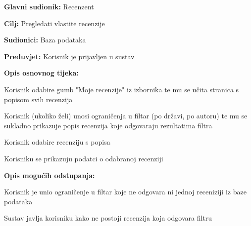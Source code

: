 					\noindent {}
					\begin{packed_item}
						
						\item \textbf{Glavni sudionik: } Recenzent
						\item  \textbf{Cilj:} Pregledati vlastite recenzije
						\item  \textbf{Sudionici:} Baza podataka
						\item  \textbf{Preduvjet:} Korisnik je prijavljen u sustav
						\item  \textbf{Opis osnovnog tijeka:}
						
						\item[] \begin{packed_enum}
							
							\item Korisnik odabire gumb "Moje recenzije" iz izbornika te mu se učita stranica s popisom svih recenzija
							\item Korisnik (ukoliko želi) unosi ograničenja u filtar (po državi, po autoru) te mu se sukladno prikazuje popis recenzija koje odgovaraju rezultatima filtra
							\item Korisnik odabire recenziju s popisa
							\item Korisniku se prikazuju podatci o odabranoj recenziji
							
							
						\end{packed_enum}
							\item \textbf{Opis mogućih odstupanja:}
						
							\item[] \begin{packed_enum}
							
							\item[2.a] Korisnik je unio ograničenje u filtar koje ne odgovara ni jednoj receniziji iz baze podataka
							\item[] \begin{packed_enum}
								\item[1.] Sustav javlja korisniku kako ne postoji recenzija koja odgovara filtru
							\end{packed_enum}
						\end{packed_enum}
						
					\end{packed_item}
					

